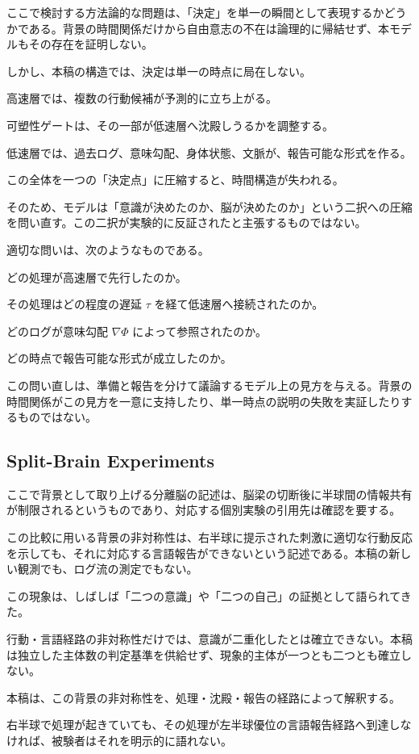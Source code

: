 ここで検討する方法論的な問題は、「決定」を単一の瞬間として表現するかどうかである。背景の時間関係だけから自由意志の不在は論理的に帰結せず、本モデルもその存在を証明しない。

しかし、本稿の構造では、決定は単一の時点に局在しない。

高速層では、複数の行動候補が予測的に立ち上がる。

可塑性ゲートは、その一部が低速層へ沈殿しうるかを調整する。

低速層では、過去ログ、意味勾配、身体状態、文脈が、報告可能な形式を作る。

この全体を一つの「決定点」に圧縮すると、時間構造が失われる。

そのため、モデルは「意識が決めたのか、脳が決めたのか」という二択への圧縮を問い直す。この二択が実験的に反証されたと主張するものではない。

適切な問いは、次のようなものである。

どの処理が高速層で先行したのか。

その処理はどの程度の遅延 $\tau$ を経て低速層へ接続されたのか。

どのログが意味勾配 $\nabla \Phi$ によって参照されたのか。

どの時点で報告可能な形式が成立したのか。

この問い直しは、準備と報告を分けて議論するモデル上の見方を与える。背景の時間関係がこの見方を一意に支持したり、単一時点の説明の失敗を実証したりするものではない。

\subsection{Split-Brain Experiments}

ここで背景として取り上げる分離脳の記述は、脳梁の切断後に半球間の情報共有が制限されるというものであり、対応する個別実験の引用先は確認を要する。

この比較に用いる背景の非対称性は、右半球に提示された刺激に適切な行動反応を示しても、それに対応する言語報告ができないという記述である。本稿の新しい観測でも、ログ流の測定でもない。

この現象は、しばしば「二つの意識」や「二つの自己」の証拠として語られてきた。

行動・言語経路の非対称性だけでは、意識が二重化したとは確立できない。本稿は独立した主体数の判定基準を供給せず、現象的主体が一つとも二つとも確立しない。

本稿は、この背景の非対称性を、処理・沈殿・報告の経路によって解釈する。

右半球で処理が起きていても、その処理が左半球優位の言語報告経路へ到達しなければ、被験者はそれを明示的に語れない。

